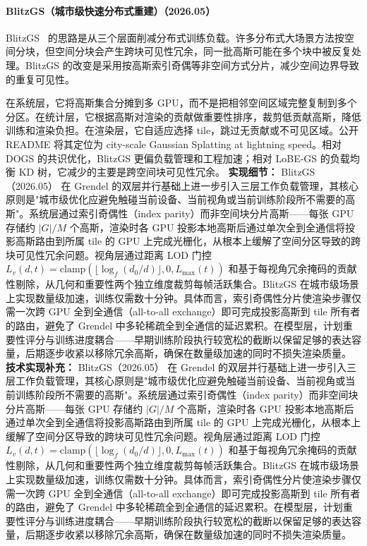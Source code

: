 \paragraph{BlitzGS（城市级快速分布式重建）（2026.05）}
BlitzGS~\cite{2605_13794} 的思路是从三个层面削减分布式训练负载。许多分布式大场景方法按空间分块，但空间分块会产生跨块可见性冗余，同一批高斯可能在多个块中被反复处理。BlitzGS 的改变是采用按高斯索引奇偶等非空间方式分片，减少空间边界导致的重复可见性。

在系统层，它将高斯集合分摊到多 GPU，而不是把相邻空间区域完整复制到多个分区。在统计层，它根据高斯对渲染的贡献做重要性排序，裁剪低贡献高斯，降低训练和渲染负担。在渲染层，它自适应选择 tile，跳过无贡献或不可见区域。公开 README 将其定位为 city-scale Gaussian Splatting at lightning speed。相对 DOGS 的共识优化，BlitzGS 更偏负载管理和工程加速；相对 LoBE-GS 的负载均衡 KD 树，它减少的主要是跨空间块可见性冗余。
\textbf{实现细节：} BlitzGS（2026.05） 在 Grendel 的双层并行基础上进一步引入三层工作负载管理，其核心原则是"城市级优化应避免触碰当前设备、当前视角或当前训练阶段所不需要的高斯"。系统层通过索引奇偶性（index parity）而非空间块分片高斯——每张 GPU 存储约 $|G|/M$ 个高斯，渲染时各 GPU 投影本地高斯后通过单次全到全通信将投影高斯路由到所属 tile 的 GPU 上完成光栅化，从根本上缓解了空间分区导致的跨块可见性冗余问题。视角层通过距离 LOD 门控 $L_v(d, t) = \mathrm{clamp}(\lfloor\log_{f}(d_0/d)\rfloor, 0, L_{\max}(t))$ 和基于每视角冗余掩码的贡献性剔除，从几何和重要性两个独立维度裁剪每帧活跃集合。BlitzGS 在城市级场景上实现数量级加速，训练仅需数十分钟。具体而言，索引奇偶性分片使渲染步骤仅需一次跨 GPU 全到全通信（all-to-all exchange）即可完成投影高斯到 tile 所有者的路由，避免了 Grendel 中多轮稀疏全到全通信的延迟累积。在模型层，计划重要性评分与训练进度耦合——早期训练阶段执行较宽松的截断以保留足够的表达容量，后期逐步收紧以移除冗余高斯，确保在数量级加速的同时不损失渲染质量。
\textbf{技术实现补充：} BlitzGS（2026.05） 在 Grendel 的双层并行基础上进一步引入三层工作负载管理，其核心原则是"城市级优化应避免触碰当前设备、当前视角或当前训练阶段所不需要的高斯"。系统层通过索引奇偶性（index parity）而非空间块分片高斯——每张 GPU 存储约 $|G|/M$ 个高斯，渲染时各 GPU 投影本地高斯后通过单次全到全通信将投影高斯路由到所属 tile 的 GPU 上完成光栅化，从根本上缓解了空间分区导致的跨块可见性冗余问题。视角层通过距离 LOD 门控 $L_v(d, t) = \mathrm{clamp}(\lfloor\log_{f}(d_0/d)\rfloor, 0, L_{\max}(t))$ 和基于每视角冗余掩码的贡献性剔除，从几何和重要性两个独立维度裁剪每帧活跃集合。BlitzGS 在城市级场景上实现数量级加速，训练仅需数十分钟。具体而言，索引奇偶性分片使渲染步骤仅需一次跨 GPU 全到全通信（all-to-all exchange）即可完成投影高斯到 tile 所有者的路由，避免了 Grendel 中多轮稀疏全到全通信的延迟累积。在模型层，计划重要性评分与训练进度耦合——早期训练阶段执行较宽松的截断以保留足够的表达容量，后期逐步收紧以移除冗余高斯，确保在数量级加速的同时不损失渲染质量。
